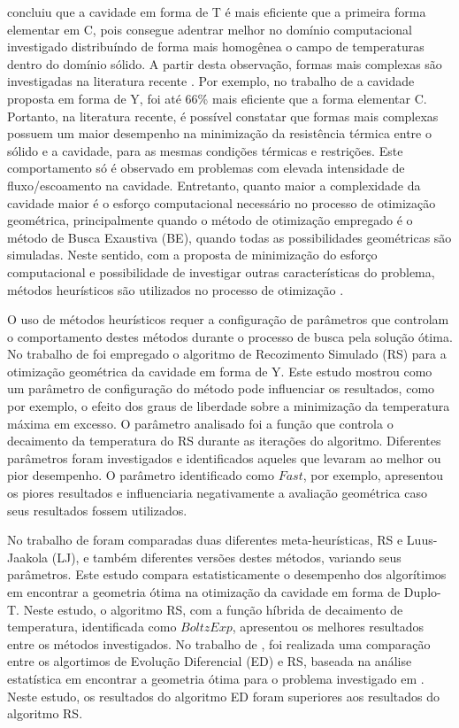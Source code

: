 \documentclass[12pt,A4,A4pt]{article}
\begin{document}
\cite{Biserni2004} concluiu que a cavidade em forma de T é mais eficiente que a primeira forma elementar em C, pois consegue adentrar melhor no domínio computacional investigado distribuíndo de forma mais homogênea o campo de temperaturas dentro do domínio sólido. A partir desta observação, formas mais complexas são investigadas na literatura recente \citep{Biserni2007,Lorenzini2011,Lorenzini2014,Biserni2017,Xie2010}. Por exemplo, no trabalho de \cite{Lorenzini2011} a cavidade proposta em forma de Y, foi até 66\% mais eficiente que a forma elementar C. Portanto, na literatura recente, é possível constatar que formas mais complexas possuem um maior desempenho na minimização da resistência térmica entre o sólido e a cavidade, para as mesmas condições térmicas e restrições. Este comportamento só é observado em problemas com elevada intensidade de fluxo/escoamento na cavidade. Entretanto, quanto maior a complexidade da cavidade maior é o esforço computacional necessário no processo de otimização geométrica, principalmente quando o método de otimização empregado é o método de Busca Exaustiva (BE), quando todas as possibilidades geométricas são simuladas. Neste sentido, com a proposta de minimização do esforço computacional e possibilidade de investigar outras características do problema, métodos heurísticos são utilizados no processo de otimização \citep{Lorenzini2014, Gonzales2015energy, Gonzales2017, Biserni2017}.

O uso de métodos heurísticos requer a configuração de parâmetros que controlam o comportamento destes métodos durante o processo de busca pela solução ótima. No trabalho de \cite{Gonzales2015energy} foi empregado o algoritmo de Recozimento Simulado (RS) para a otimização geométrica da cavidade em forma de Y. Este estudo mostrou como um parâmetro de configuração do método pode influenciar os resultados, como por exemplo, o efeito dos graus de liberdade sobre a minimização da temperatura máxima em excesso. O parâmetro analisado foi a função que controla o decaimento da temperatura do RS durante as iterações do algoritmo. Diferentes parâmetros foram investigados e identificados aqueles que levaram ao melhor ou pior desempenho. O parâmetro identificado como $Fast$, por exemplo, apresentou os piores resultados e influenciaria negativamente a avaliação geométrica caso seus resultados fossem utilizados. 

No trabalho de \cite{Gonzales2017} foram comparadas duas diferentes meta-heurísticas, RS e Luus-Jaakola (LJ), e também diferentes versões destes métodos, variando seus parâmetros. Este estudo compara estatisticamente o desempenho dos algorítimos em encontrar a geometria ótima na otimização da cavidade em forma de Duplo-T. Neste estudo, o algoritmo RS, com a função híbrida de decaimento de temperatura, identificada como $BoltzExp$, apresentou os melhores resultados entre os métodos investigados. No trabalho de \cite{Gonzales2018}, foi realizada uma comparação entre os algortimos de Evolução Diferencial (ED) e RS, baseada na análise estatística em encontrar a geometria ótima para o problema investigado em \cite{Gonzales2017}. Neste estudo, os resultados do algoritmo ED foram superiores aos resultados do algoritmo RS.
\end{document}
